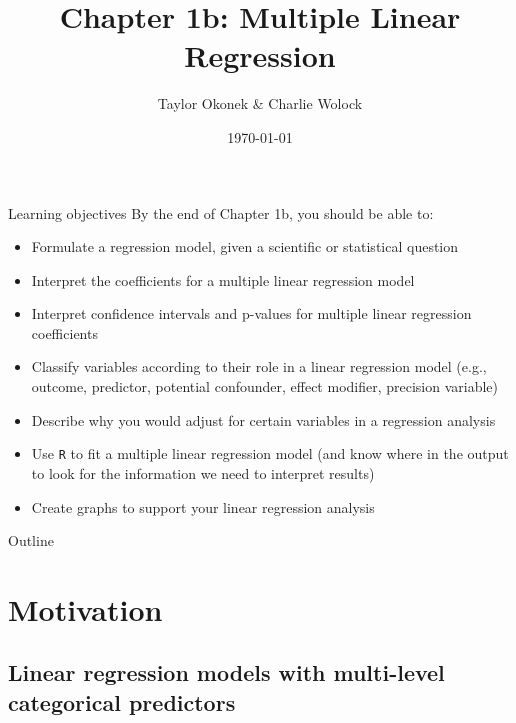 \documentclass[10pt,t]{beamer}
\title{Chapter 1b: Multiple Linear Regression}
\author{Taylor Okonek \& Charlie Wolock}
\date{\today}
\begin{document}
	\begin{frame}
	\titlepage 
\end{frame}

\begin{frame}{Learning objectives}
By the end of Chapter 1b, you should be able to:
\begin{itemize}
	\item Formulate a regression model, given a scientific or statistical question
	\item Interpret the coefficients for a multiple linear regression model
	\item Interpret confidence intervals and p-values for multiple linear regression coefficients
	\item Classify variables according to their role in a linear regression model (e.g., outcome, predictor, potential confounder, effect modifier, precision variable)
	\item Describe why you would adjust for certain variables in a regression analysis
	\item Use \texttt{R} to fit a multiple linear regression model (and know where in the output to look for the information we need to interpret results)
	\item Create graphs to support your linear regression analysis
\end{itemize}
\end{frame}

\begin{frame}{Outline}
\tableofcontents
\end{frame}




\section{Motivation}

\subsection{Linear regression models with multi-level categorical predictors}
\end{document}
